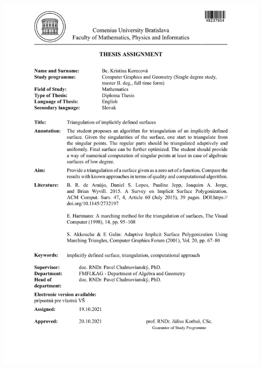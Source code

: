\documentclass[12pt, twoside]{book}
\begin{document}
\hspace{-2cm}\includegraphics[page=2,width=1.1\textwidth]{images/zadanie-en}
\end{document}
